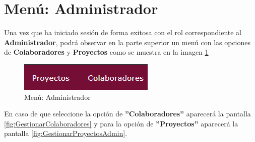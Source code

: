 \section{Menú: Administrador}

	Una vez que ha iniciado sesión de forma exitosa con el rol correspondiente al \textbf{Administrador}, podrá observar en la parte superior un menú con las opciones de \textbf{Colaboradores} y \textbf{Proyectos} como se muestra en la imagen \ref{fig:MN-AD}

		\begin{figure}[htbp!]
			\begin{center}
				\includegraphics[scale=1]{roles/administrador/menu/pantallas/MN-AD}
				\caption{Menú: Administrador}
				\label{fig:MN-AD}
			\end{center}
		\end{figure}
	
	En caso de que seleccione la opción de \textbf{''Colaboradores''} aparecerá la pantalla \ref{fig:GestionarColaboradores} y para la opción de \textbf{''Proyectos''} aparecerá la pantalla \ref{fig:GestionarProyectosAdmin}.
\newpage
